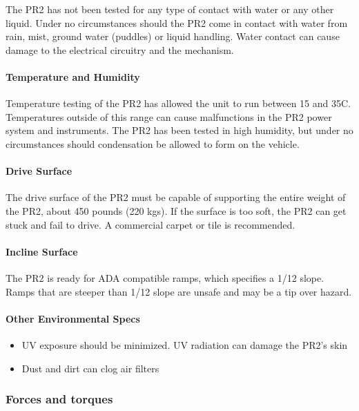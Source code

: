 The PR2 has not been tested for any type of contact with water or any other liquid. Under no circumstances should the PR2 come in contact with water from rain, mist, ground water (puddles) or liquid handling. Water contact can cause damage to the electrical circuitry and the mechanism.

\paragraph{Temperature and Humidity}

Temperature testing of the PR2 has allowed the unit to run between 15 and 35C. Temperatures outside of this range can cause malfunctions in the PR2 power system and instruments. The PR2 has been tested in high humidity, but under no circumstances should condensation be allowed to form on the vehicle.

\paragraph{Drive Surface}

The drive surface of the PR2 must be capable of supporting the entire weight of the PR2, about 450 pounds (220 kgs). If the surface is too soft, the PR2 can get stuck and fail to drive. A commercial carpet or tile is recommended. 

\paragraph{Incline Surface}

The PR2 is ready for ADA compatible ramps, which specifies a 1/12 slope. Ramps that are steeper than 1/12 slope are unsafe and may be a tip over hazard.

\paragraph{Other Environmental Specs}

\begin{itemize}
\item UV exposure should be minimized. UV radiation can damage the PR2's skin
\item Dust and dirt can clog air filters
\end{itemize}

\subsubsection{Forces and torques}


